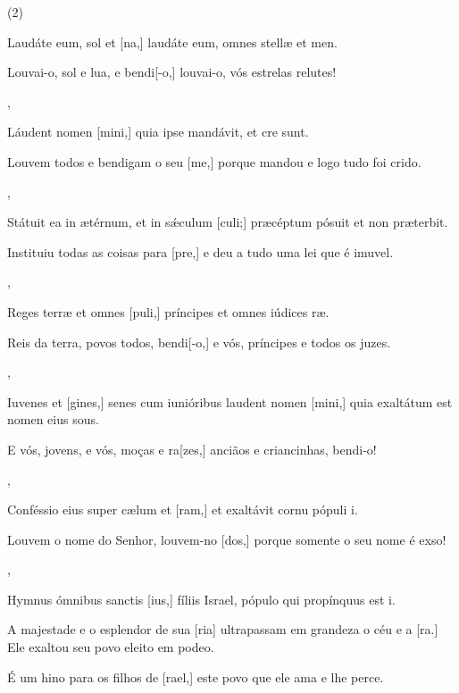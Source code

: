 \SetVersePairs(2){
  {\item {}Laudáte eum, sol et [na,] laudáte eum, omnes stellæ et men.~\Responsorium}%
    {\item {}Louvai-o, sol e lua, e bendi[-o,] louvai-o, vós estrelas relutes!~\Responsorium},
  {\item {}Láudent nomen [mini,] quia ipse mandávit, et cre sunt.~\Responsorium}%
    {\item {}Louvem todos e bendigam o seu [me,] porque mandou e logo tudo foi crido.~\Responsorium},
  {\item {}Státuit ea in ætérnum, et in sǽculum [culi;] præcéptum pósuit et non præterbit.~\Responsorium}%
    {\item {}Instituiu todas as coisas para [pre,] e deu a tudo uma lei que é imuvel.~\Responsorium},
  {\item {}Reges terræ et omnes [puli,] príncipes et omnes iúdices ræ.~\Responsorium}%
    {\item {}Reis da terra, povos todos, bendi[-o,] e vós, príncipes e todos os juzes.~\Responsorium},
  {\item {}Iuvenes et [gines,] senes cum iunióribus laudent nomen [mini,] quia exaltátum est nomen eius sous.~\Responsorium}%
    {\item {}E vós, jovens, e vós, moças e ra[zes,] anciãos e criancinhas, bendi-o!~\Responsorium},
  {\item {}Conféssio eius super cælum et [ram,] et exaltávit cornu pópuli i.~\Responsorium}%
    {\item {}Louvem o nome do Senhor, louvem-no [dos,] porque somente o seu nome é exso!~\Responsorium},
  {\item {}Hymnus ómnibus sanctis [ius,] fíliis Israel, pópulo qui propínquus est i.~\Responsorium}%
    {\item {}A majestade e o esplendor de sua [ria] ultrapassam em grandeza o céu e a [ra.] Ele exaltou seu povo eleito em podeo.~\Responsorium
      \item {}É um hino para os filhos de [rael,] este povo que ele ama e lhe perce.~\Responsorium}
}